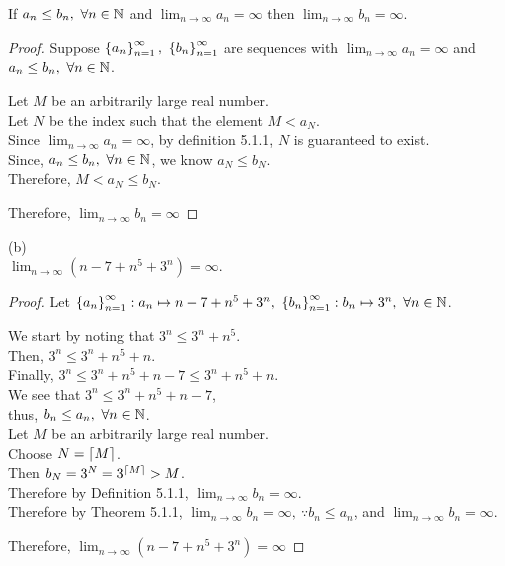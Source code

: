 \documentclass[a4paper,12pt]{report}
\begin{document}
 If $a_n \leq b_n,\ \forall n\in\mathbb{N}$ and $\lim_{n\to\infty} a_n = \infty$ then $\lim_{n\to\infty} b_n = \infty$. 

\begin{proof}
	Suppose $\braces{a_n}_{n=1}^{\infty},\ \braces{b_n}_{n=1}^{\infty}$ are sequences with $\lim_{n\to\infty} a_n = \infty$ and $a_n \leq b_n,\ \forall n\in\mathbb{N}$.
	\begin{list}{}{\setlength{\leftmargin}{1in}\setlength{\topsep}{0pt}}\item
		Let $M$ be an arbitrarily large real number. \\
		Let $N$ be the index such that the element $M < a_N$. \\
		Since $\lim_{n\to\infty} a_n = \infty$, by definition 5.1.1, $N$ is guaranteed to exist. \\
		Since, $a_n \leq b_n,\ \forall n\in\mathbb{N}$, we know $a_N \leq b_N$. \\
		Therefore, $M < a_N \leq b_N$.
	\end{list}
	Therefore, $\lim_{n\to\infty} b_n = \infty$
\end{proof}

\sol (b) \\
\Corol $\lim_{n\to\infty} (n - 7 + n^5 + 3^n) = \infty$.
\begin{proof}
	Let $\left\lbrace a_n \right\rbrace_{n=1}^\infty: a_n \mapsto n - 7 + n^5 + 3^n,\ \left\lbrace b_n \right\rbrace_{n=1}^\infty: b_n \mapsto 3^n,\ \forall n\in\mathbb{N}$.
	\begin{list}{}{\setlength{\leftmargin}{1in}\setlength{\topsep}{0pt}}\item
		We start by noting that $3^n \leq 3^n + n^5$. \\
		Then, $3^n \leq 3^n + n^5 + n$. \\
		Finally, $3^n \leq 3^n + n^5 + n - 7 \leq 3^n + n^5 + n$. \\
		We see that $3^n \leq 3^n + n^5 + n - 7$,\\
		thus, $b_n \leq a_n,\ \forall n\in\mathbb{N}$. \\
		Let $M$ be an arbitrarily large real number. \\
		Choose $N = \left\lceil M \right\rceil$. \\
		Then $b_N = 3^N = 3^{\left\lceil M \right\rceil} > M$. \\
		Therefore by Definition 5.1.1, $\lim_{n\to\infty} b_n = \infty$. \\
		Therefore by Theorem 5.1.1, $\lim_{n\to\infty} b_n = \infty,\ \because b_n \leq a_n$, and $\lim_{n\to\infty} b_n = \infty$.
	\end{list}
	Therefore, $\lim_{n\to\infty} (n - 7 + n^5 + 3^n) = \infty$
\end{proof}
\end{document}

